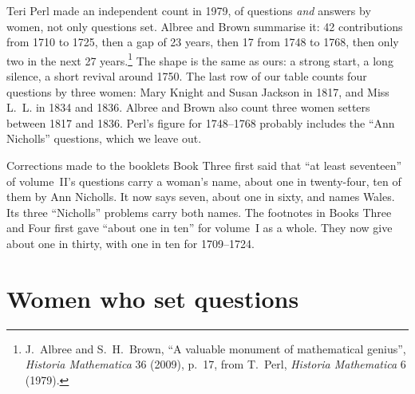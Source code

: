 \documentclass[11pt,a4paper]{article}
\begin{document}
Teri Perl made an independent count in 1979, of questions \emph{and} answers by
women, not only questions set. Albree and Brown summarise it: 42 contributions from
1710 to 1725, then a gap of 23 years, then 17 from 1748 to 1768, then only two in the
next 27 years.\footnote{J.~Albree and S.~H.~Brown, ``A valuable monument of
mathematical genius'', \textit{Historia Mathematica} 36 (2009), p.~17, from T.~Perl,
\textit{Historia Mathematica} 6 (1979).} The shape is the same as ours: a strong start,
a long silence, a short revival around 1750. The last row of our table
counts four questions by three women: Mary Knight and Susan Jackson in 1817, and Miss
L.~L. in 1834 and 1836. Albree and Brown also count three women setters between 1817 and
1836. Perl's figure for 1748--1768 probably
includes the ``Ann Nicholls'' questions, which we leave out.

\begin{note}{Corrections made to the booklets}
Book Three first said that ``at least seventeen'' of volume~II's questions carry a
woman's name, about one in twenty-four, ten of them by Ann Nicholls. It now says seven,
about one in sixty, and names Wales. Its three ``Nicholls'' problems carry both names.
The footnotes in Books Three and Four first gave ``about one in ten'' for volume~I as a
whole. They now give about one in thirty, with one in ten for 1709--1724.
\end{note}

\section*{Women who set questions}
\end{document}
